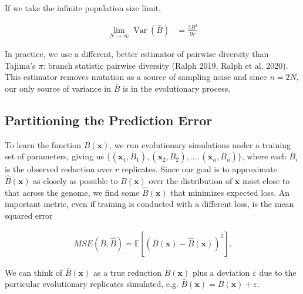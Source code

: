 \documentclass[11pt]{article}
\newcommand{\E}{\mathbb{E}}
\DeclareMathOperator{\var}{Var}
\begin{document}
If we take the infinite population size limit,

\begin{align}
  \lim_{N \to \infty} \var(\bar{B}) &= \frac{2B^2}{9r}
\end{align}

In practice, we use a different, better estimator of pairwise diversity than
Tajima's $\pi$: branch statistic pairwise diversity (Ralph 2019, Ralph et al.
2020). This estimator removes mutation as a source of sampling noise and since
$n = 2N$, our only source of variance in $\bar{B}$ is in the evolutionary
process.






\subsection*{Partitioning the Prediction Error}

To learn the function $B(\mathbf{x})$, we run evolutionary simulations under a
training set of parameters, giving us $\{(\mathbf{x}_1, \bar{B}_1),
(\mathbf{x}_2, \bar{B}_2), \ldots, (\mathbf{x}_n, \bar{B}_n)\}$, where each
$\bar{B}_i$ is the observed reduction over $r$ replicates. Since our goal is to
approximate $\hat{B}(\mathbf{x})$ as closely as possible to $B(\mathbf{x})$
over the distribution of $\mathbf{x}$ most close to that across the genome, we
find some $\hat{B}(\mathbf{x})$ that minimizes expected loss. An important
metric, even if training is conducted with a different loss, is the mean
squared error 

\begin{align}
  MSE(\bar{B}, \hat{B}) = \E[(\bar{B}(\mathbf{x}) - \hat{B}(\mathbf{x}))^2].
\end{align}

We can think of $\bar{B}(\mathbf{x})$ as a true reduction $B(\mathbf{x})$ plus
a deviation $\varepsilon$ due to the particular evolutionary replicates
simulated, e.g. $\bar{B}(\mathbf{x}) = B(\mathbf{x}) + \varepsilon$.
\end{document}
